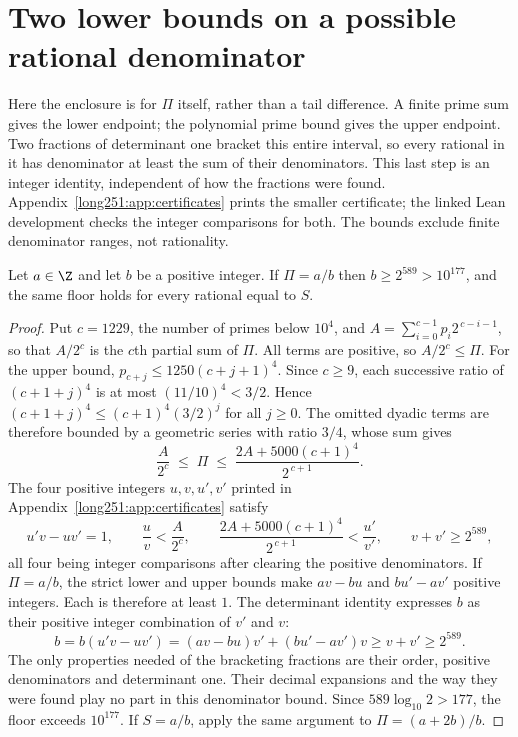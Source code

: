 \section{Two lower bounds on a possible rational denominator}\label{long251:sec:denominator-floor}

Here the enclosure is for $\Pi$ itself, rather than a tail difference.
A finite prime sum gives the lower endpoint; the polynomial prime bound
gives the upper endpoint.  Two fractions of determinant one bracket this
entire interval, so every rational in it has denominator at least the sum
of their denominators.  This last step is an integer identity, independent
of how the fractions were found.  Appendix~\ref{long251:app:certificates}
prints the smaller certificate; the linked Lean development checks the
integer comparisons for both.  The bounds exclude finite denominator
ranges, not rationality.

\begin{theorem}\label{long251:res:denominatorfloor}
Let $a\in\Z$ and let $b$ be a positive integer.  If $\Pi=a/b$ then $b\ge2^{589}>10^{177}$, and
the same floor holds for every rational equal to $S$.
\end{theorem}

\begin{proof}
Put $c=1229$, the number of primes below $10^4$, and
$A=\sum_{i=0}^{c-1}p_i2^{\,c-i-1}$, so that $A/2^{c}$ is the $c$th partial sum
of $\Pi$.  All terms are positive, so $A/2^{c}\le\Pi$.  For the upper bound,
$p_{c+j}\le1250(c+j+1)^4$.  Since $c\ge9$, each successive ratio of
$(c+1+j)^4$ is at most $(11/10)^4<3/2$.  Hence
$(c+1+j)^4\le(c+1)^4(3/2)^j$ for all $j\ge0$.
The omitted dyadic terms are therefore bounded by a geometric series
with ratio $3/4$, whose sum gives
\[
 \frac{A}{2^{c}}\;\le\;\Pi\;\le\;\frac{2A+5000(c+1)^4}{2^{\,c+1}} .
\]
The four positive integers $u,v,u',v'$ printed in
Appendix~\ref{long251:app:certificates} satisfy
\[
 u'v-uv'=1,\qquad
 \frac uv<\frac{A}{2^{c}},\qquad
 \frac{2A+5000(c+1)^4}{2^{\,c+1}}<\frac{u'}{v'},\qquad
 v+v'\ge2^{589},
\]
all four being integer comparisons after clearing the positive denominators.
If $\Pi=a/b$, the strict lower and upper bounds make $av-bu$ and
$bu'-av'$ positive integers.  Each is therefore at least $1$.
The determinant identity expresses $b$ as their positive integer
combination of $v'$ and $v$:
\[
 b=b(u'v-uv')=(av-bu)v'+(bu'-av')v\ge v+v' \ge 2^{589}.
\]
The only properties needed of the bracketing fractions are their order,
positive denominators and determinant one.  Their decimal expansions
and the way they were found play no part in this denominator bound.
Since $589\log_{10}2>177$, the floor exceeds $10^{177}$.  If $S=a/b$, apply the
same argument to $\Pi=(a+2b)/b$.
\end{proof}

